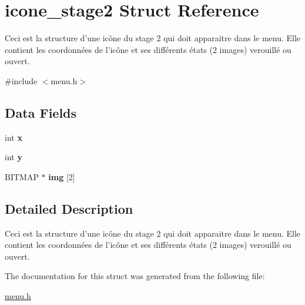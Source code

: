 \hypertarget{structicone__stage2}{\section{icone\-\_\-stage2 Struct Reference}
\label{structicone__stage2}
}


Ceci est la structure d'une icône du stage 2 qui doit apparaitre dans le menu. Elle contient les coordonnées de l'icône et ses différents états (2 images) verouillé ou ouvert.  




{\ttfamily \#include $<$menu.\-h$>$}

\subsection*{Data Fields}
\begin{DoxyCompactItemize}
\item 
\hypertarget{structicone__stage2_a6150e0515f7202e2fb518f7206ed97dc}{int {\bfseries x}}\label{structicone__stage2_a6150e0515f7202e2fb518f7206ed97dc}

\item 
\hypertarget{structicone__stage2_a0a2f84ed7838f07779ae24c5a9086d33}{int {\bfseries y}}\label{structicone__stage2_a0a2f84ed7838f07779ae24c5a9086d33}

\item 
\hypertarget{structicone__stage2_ab1bd34bcded6c8709b926189b4f50c2c}{B\-I\-T\-M\-A\-P $\ast$ {\bfseries img} \mbox{[}2\mbox{]}}\label{structicone__stage2_ab1bd34bcded6c8709b926189b4f50c2c}

\end{DoxyCompactItemize}


\subsection{Detailed Description}
Ceci est la structure d'une icône du stage 2 qui doit apparaitre dans le menu. Elle contient les coordonnées de l'icône et ses différents états (2 images) verouillé ou ouvert. 


\begin{DoxyItemize}
\item 
\end{DoxyItemize}

The documentation for this struct was generated from the following file\-:\begin{DoxyCompactItemize}
\item 
\hyperlink{menu_8h}{menu.\-h}\end{DoxyCompactItemize}
